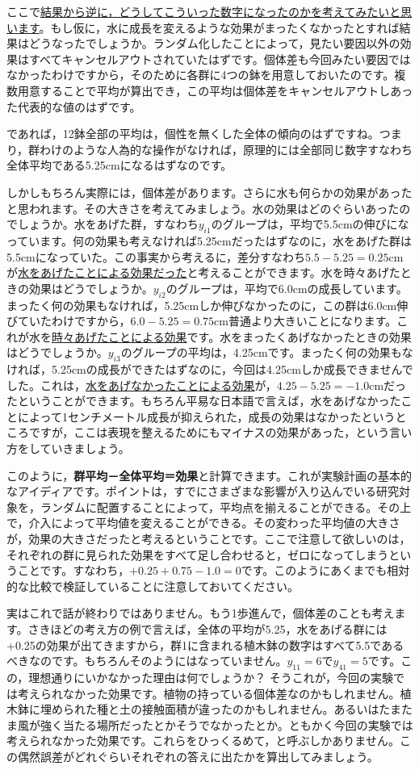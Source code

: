 \documentclass{ltjbook}
\begin{document}
ここで\underline{結果から逆に，どうしてこういった数字になったのかを考えてみたいと思います}。もし仮に，水に成長を変えるような効果がまったくなかったとすれば結果はどうなったでしょうか。ランダム化したことによって，見たい要因以外の効果はすべてキャンセルアウトされていたはずです。個体差も今回みたい要因ではなかったわけですから，そのために各群に4つの鉢を用意しておいたのです。複数用意することで平均が算出でき，この平均は個体差をキャンセルアウトしあった代表的な値のはずです。

であれば，12鉢全部の平均は，個性を無くした全体の傾向のはずですね。つまり，群わけのような人為的な操作がなければ，原理的には全部同じ数字すなわち全体平均である5.25cmになるはずなのです。

しかしもちろん実際には，個体差があります。さらに水も何らかの効果があったと思われます。その大きさを考えてみましょう。水の効果はどのぐらいあったのでしょうか。水をあげた群，すなわち$y_{i1}$のグループは，平均で5.5cmの伸びになっています。何の効果も考えなければ5.25cmだったはずなのに，水をあげた群は5.5cmになっていた。この事実から考えるに，差分すなわち$5.5-5.25=0.25$cmが\underline{水をあげたことによる効果だった}と考えることができます。水を時々あげたときの効果はどうでしょうか。$y_{i2}$のグループは，平均で6.0cmの成長しています。まったく何の効果もなければ，5.25cmしか伸びなかったのに，この群は6.0cm伸びていたわけですから，$6.0-5.25=0.75$cm普通より大きいことになります。これが水を\underline{時々あげたことによる効果}です。水をまったくあげなかったときの効果はどうでしょうか。$y_{i3}$のグループの平均は，4.25cmです。まったく何の効果もなければ，5.25cmの成長ができたはずなのに，今回は4.25cmしか成長できませんでした。これは，\underline{水をあげなかったことによる効果}が，$4.25-5.25=-1.0$cmだったということができます。もちろん平易な日本語で言えば，水をあげなかったことによって1センチメートル成長が抑えられた，成長の効果はなかったというところですが，ここは表現を整えるためにもマイナスの効果があった，という言い方をしていきましょう。

このように，\textbf{群平均－全体平均＝効果}と計算できます。これが実験計画の基本的なアイディアです。ポイントは，すでにさまざまな影響が入り込んでいる研究対象を，ランダムに配置することによって，平均点を揃えることができる。その上で，介入によって平均値を変えることができる。その変わった平均値の大きさが，効果の大きさだったと考えるということです。ここで注意して欲しいのは，それぞれの群に見られた効果をすべて足し合わせると，ゼロになってしまうということです。すなわち，$+0.25+0.75-1.0=0$です。このようにあくまでも相対的な比較で検証していることに注意しておいてください。

実はこれで話が終わりではありません。もう1歩進んで，個体差のことも考えます。さきほどの考え方の例で言えば，全体の平均が5.25，水をあげる群には+0.25の効果が出てきますから，群1に含まれる植木鉢の数字はすべて5.5であるべきなのです。もちろんそのようにはなっていません。$y_{11} = 6$で$y_{41}=5$です。この，理想通りにいかなかった理由は何でしょうか？ そうこれが，今回の実験では考えられなかった効果です。植物の持っている個体差なのかもしれません。植木鉢に埋められた種と土の接触面積が違ったのかもしれません。あるいはたまたま風が強く当たる場所だったとかそうでなかったとか。ともかく今回の実験では考えられなかった効果です。これらをひっくるめて，と呼ぶしかありません。この偶然誤差がどれぐらいそれぞれの答えに出たかを算出してみましょう。
\end{document}
